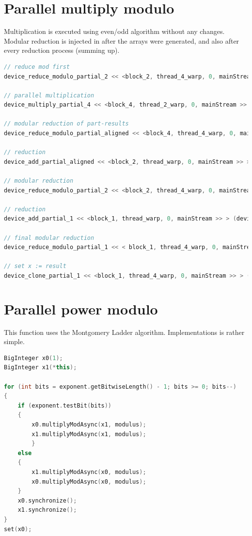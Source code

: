 \documentclass[oneside,openright,12pt,final,en]{mgr}
\begin{document}
\section{Parallel multiply modulo}

Multiplication is executed using even/odd algorithm without any changes. 
Modular reduction is injected in after the arrays were generated, and also after every reduction process (summing up).

\begin{lstlisting}[language=cpp]
// reduce mod first
device_reduce_modulo_partial_2 << <block_2, thread_4_warp, 0, mainStream >> > (device_x, deviceArray, device_m);

// parallel multiplication
device_multiply_partial_4 << <block_4, thread_2_warp, 0, mainStream >> > (device4arrays, device_x, deviceArray);

// modular reduction of part-results
device_reduce_modulo_partial_aligned << <block_4, thread_4_warp, 0, mainStream >> > (device4arrays, device_m);

// reduction
device_add_partial_aligned << <block_2, thread_warp, 0, mainStream >> > (device4arrays, device4arrays + 256);

// modular reduction
device_reduce_modulo_partial_2 << <block_2, thread_4_warp, 0, mainStream >> > (device4arrays, device4arrays + 128, device_m);

// reduction
device_add_partial_1 << <block_1, thread_warp, 0, mainStream >> > (device4arrays, device4arrays + 128);

// final modular reduction
device_reduce_modulo_partial_1 << < block_1, thread_4_warp, 0, mainStream >> > (device4arrays, device_m);

// set x := result
device_clone_partial_1 << <block_1, thread_4_warp, 0, mainStream >> > (device_x, device4arrays);
\end{lstlisting}

\section{Parallel power modulo}

This function uses the Montgomery Ladder algorithm. Implementations is rather simple. 


\begin{lstlisting}[language=cpp]
BigInteger x0(1);
BigInteger x1(*this);	

for (int bits = exponent.getBitwiseLength() - 1; bits >= 0; bits--)
{
	if (exponent.testBit(bits))
	{
		x0.multiplyModAsync(x1, modulus);
		x1.multiplyModAsync(x1, modulus);
		}
	else
	{
		x1.multiplyModAsync(x0, modulus);
		x0.multiplyModAsync(x0, modulus);
	}			
	x0.synchronize();
	x1.synchronize();		
}
set(x0);
\end{lstlisting}
\end{document}
